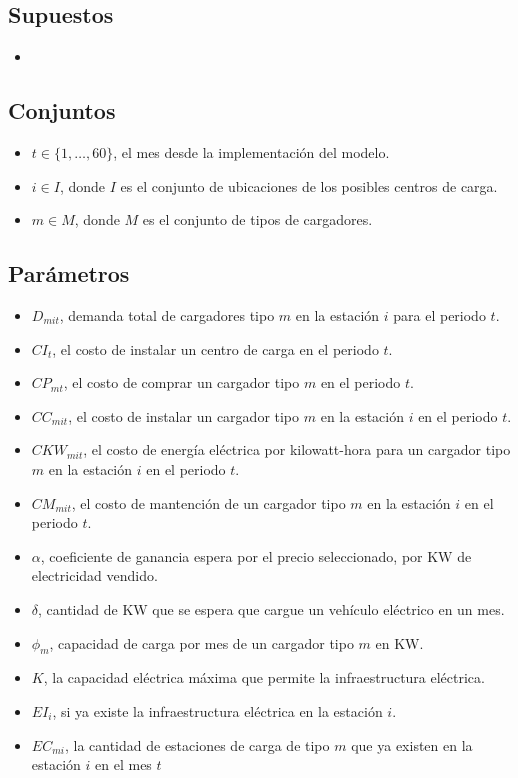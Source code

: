 \documentclass[letterpaper]{article}
\begin{document}
\begin{flushleft}
	\subsection*{Supuestos}
	\begin{itemize}
		\item 
	\end{itemize}
	\subsection{Conjuntos}
	\begin{itemize}
		\item $t \in \{1, \ldots, 60\}$, el mes desde la implementación del modelo.
		\item $i \in I$, donde $I$ es el conjunto de ubicaciones de los posibles centros de carga.
		\item $m \in M$, donde $M$ es el conjunto de tipos de cargadores.
	\end{itemize}

	\subsection{Parámetros}
	\begin{itemize}
		\item $D_{mit}$, demanda total de cargadores tipo $m$ en la estación $i$ para el periodo $t$.
		\item $CI_{t}$, el costo de instalar un centro de carga en el periodo $t$.
		\item $CP_{mt}$, el costo de comprar un cargador tipo $m$ en el periodo $t$.
		\item $CC_{mit}$, el costo de instalar un cargador tipo $m$ en la estación $i$ en el periodo $t$.
		\item $CKW_{mit}$, el costo de energía eléctrica por kilowatt-hora para un cargador tipo $m$ en la estación $i$ en el periodo $t$.
		\item $CM_{mit}$, el costo de mantención de un cargador tipo $m$ en la estación $i$ en el periodo $t$.
		\item $\alpha$, coeficiente de ganancia espera por el precio seleccionado, por KW de electricidad vendido.
		\item $\delta$, cantidad de KW que se espera que cargue un vehículo eléctrico en un mes.
		\item $\phi_m$, capacidad de carga por mes de un cargador tipo $m$ en KW.
		\item $K$, la capacidad eléctrica máxima que permite la infraestructura eléctrica.
		\item $EI_{i}$, si ya existe la infraestructura eléctrica en la estación $i$.
		\item $EC_{mi}$, la cantidad de estaciones de carga de tipo $m$ que ya existen en la estación $i$ en el mes $t$
	\end{itemize}

\end{flushleft}
\end{document}
